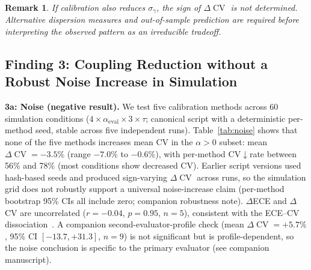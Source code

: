 \documentclass[11pt]{article}
\DeclareMathOperator{\CV}{CV}
\newtheorem{remark}{Remark}
\begin{document}
\begin{remark}
If calibration also reduces $\sigma_\gamma$, the sign of $\Delta\CV$ is not determined. Alternative dispersion measures and out-of-sample prediction are required before interpreting the observed pattern as an irreducible tradeoff.
\end{remark}


\subsection{Finding 3: Coupling Reduction without a Robust Noise Increase in Simulation}

\textbf{3a: Noise (negative result).} We test five calibration methods across 60 simulation conditions ($4 \times \alpha_{\text{eval}} \times 3 \times \tau$; canonical script with a deterministic per-method seed, stable across five independent runs). Table~\ref{tab:noise} shows that none of the five methods increases mean CV in the $\alpha{>}0$ subset: mean $\Delta\CV = -3.5\%$ (range $-7.0\%$ to $-0.6\%$), with per-method CV$\downarrow$rate between 56\% and 78\% (most conditions show decreased CV). Earlier script versions used hash-based seeds and produced sign-varying $\Delta\CV$ across runs, so the simulation grid does not robustly support a universal noise-increase claim (per-method bootstrap 95\% CIs all include zero; companion robustness note). $\Delta$ECE and $\Delta$CV are uncorrelated ($r = -0.04$, $p = 0.95$, $n{=}5$), consistent with the ECE--CV dissociation~\citep{tian2023calibration}. A companion second-evaluator-profile check (mean $\Delta\CV = +5.7\%$, 95\% CI $[-13.7, +31.3]$, $n{=}9$) is not significant but is profile-dependent, so the noise conclusion is specific to the primary evaluator (see companion manuscript).
\end{document}
